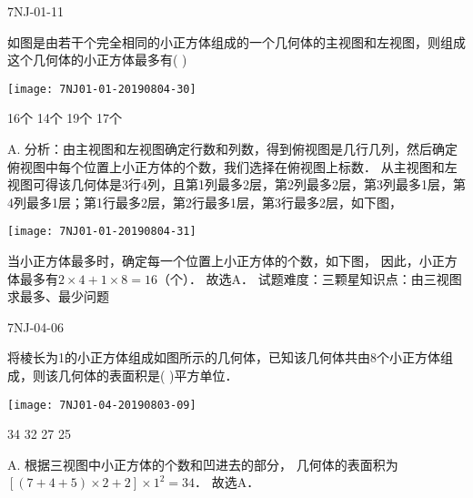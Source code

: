\begin{defproblem}{7NJ-01-11}%
\begin{onlyproblem}%
如图是由若干个完全相同的小正方体组成的一个几何体的主视图和左视图，则组成这个几何体的小正方体最多有(    ) 
\begin{center}
\texttt{[image: 7NJ01-01-20190804-30]}
\end{center}

\xx
{16个}
{14个}
{19个}
{17个}

\end{onlyproblem}%
\begin{onlysolution}%
\begin{solution}%
A. 
分析：由主视图和左视图确定行数和列数，得到俯视图是几行几列，然后确定俯视图中每个位置上小正方体的个数，我们选择在俯视图上标数． 从主视图和左视图可得该几何体是3行4列，且第1列最多2层，第2列最多2层，第3列最多1层，第4列最多1层；第1行最多2层，第2行最多1层，第3行最多2层，如下图，
\begin{center}
\texttt{[image: 7NJ01-01-20190804-31]}
\end{center} 
当小正方体最多时，确定每一个位置上小正方体的个数，如下图，   因此，小正方体最多有$2\times4+1\times8=16$（个）． 故选A． 
试题难度：三颗星知识点：由三视图求最多、最少问题  

\end{solution}%
\end{onlysolution}%
\end{defproblem}




\begin{defproblem}{7NJ-04-06}%
\begin{onlyproblem}%
将棱长为1的小正方体组成如图所示的几何体，已知该几何体共由8个小正方体组成，则该几何体的表面积是(    )平方单位． 
\begin{center}
\texttt{[image: 7NJ01-04-20190803-09]}
\end{center}

\xx
{34}
{32}
{27}
{25}

\end{onlyproblem}%
\begin{onlysolution}%
\begin{solution}%
A. 根据三视图中小正方体的个数和凹进去的部分， 几何体的表面积为$[(7+4+5) \times 2+2] \times 1^{2}=34$． 故选A． 
\end{solution}%
\end{onlysolution}%
\end{defproblem}




